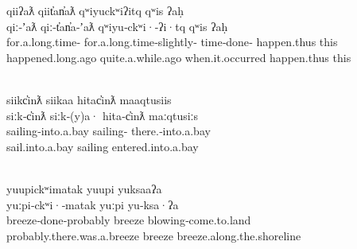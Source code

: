 \begin{exe}

  \ex\label{ex:3.18}
  \singlespacing
  \renewcommand{\eachwordfive}{\rule[-10pt]{0pt}{0pt}\rmfamily}

  \glllll qiiʔaƛ          qiit̓an̓aƛ                 qʷiyuckʷiʔitq qʷis ʔaḥ\\
          qiː‑ʼaƛ                  qiː‑t̓an̓a‑ʼaƛ                      qʷiyu‑ckʷi·‑ʔi·tq      qʷis          ʔaḥ\\
          for.a.long.time‑ for.a.long.time‑slightly‑ time‑done‑   happen.thus   this\\
          happened.long.ago        quite.a.while.ago                 when.it.occurred       happen.thus   this\\
                                                   { }                         \\
          \vfix

  \glllll siikc̓inƛ  siikaa   hitac̓inƛ         maaqtusiis\\
          siːk‑c̓inƛ          siːk‑(y)a·        hita‑c̓inƛ                 maːqtusiːs\\
          sailing‑into.a.bay sailing‑ there.‑into.a.bay \\
          sail.into.a.bay    sailing           entered.into.a.bay        \\
                                              \\
          \vfix

  \glllll yuupickʷimatak    yuupi yuksaaʔa\\
          yuːpi‑ckʷi·‑matak           yuːpi           yu‑ksa·ʔa\\
          breeze‑done‑probably        breeze          blowing‑come.to.land\\
          probably.there.was.a.breeze breeze          breeze.along.the.shoreline\\
                                     \\
          \vfix


\end{exe}
